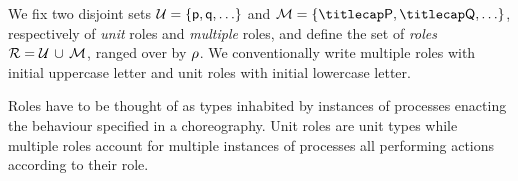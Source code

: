 %

We fix two disjoint sets $\participants = \{\ptp p, \ptp q, \ldots\}$
and $\multiroles = \{\amulti P, \amulti Q, \ldots \}$, respectively of
\emph{unit} roles and \emph{multiple} roles, and define the set of
\emph{roles} $\mathcal{R} = \mathcal{U}\, \cup\, \mathcal{M}$, ranged over by $\rho$.
%
We conventionally write multiple roles with initial uppercase letter and
unit roles with initial lowercase letter.
%

Roles have to be thought of as types inhabited by instances of
processes enacting the behaviour specified in a choreography.
%
Unit roles are unit types while multiple roles account for multiple
instances of processes all performing actions according to their role.
%

